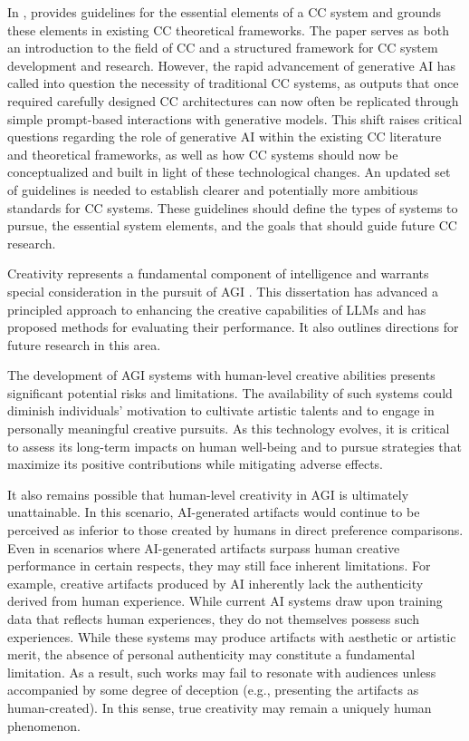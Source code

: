 \documentclass[phd,electronic,oneside,twosidetoc,letterpaper,chaptercenter,parttop,lof]{byumsphd}
\begin{document}
In \cite{ventura2017howto}, \citeauthor{ventura2017howto} provides guidelines for the essential elements of a CC system and grounds these elements in existing CC theoretical frameworks. 
The paper serves as both an introduction to the field of CC and a structured framework for CC system development and research. 
However, the rapid advancement of generative AI has called into question the necessity of traditional CC systems, as outputs that once required carefully designed CC architectures can now often be replicated through simple prompt-based interactions with generative models. 
This shift raises critical questions regarding the role of generative AI within the existing CC literature and theoretical frameworks, as well as how CC systems should now be conceptualized and built in light of these technological changes. 
An updated set of guidelines is needed to establish clearer and potentially more ambitious standards for CC systems. 
These guidelines should define the types of systems to pursue, the essential system elements, and the goals that should guide future CC research.

Creativity represents a fundamental component of intelligence and warrants special consideration in the pursuit of AGI \cite{Morris2023PositionLO}. 
This dissertation has advanced a principled approach to enhancing the creative capabilities of LLMs and has proposed methods for evaluating their performance. 
It also outlines directions for future research in this area.

The development of AGI systems with human-level creative abilities presents significant potential risks and limitations. 
The availability of such systems could diminish individuals' motivation to cultivate artistic talents and to engage in personally meaningful creative pursuits. 
As this technology evolves, it is critical to assess its long-term impacts on human well-being and to pursue strategies that maximize its positive contributions while mitigating adverse effects.

It also remains possible that human-level creativity in AGI is ultimately unattainable. 
In this scenario, AI-generated artifacts would continue to be perceived as inferior to those created by humans in direct preference comparisons. 
Even in scenarios where AI-generated artifacts surpass human creative performance in certain respects, they may still face inherent limitations.
For example, creative artifacts produced by AI inherently lack the authenticity derived from human experience. 
While current AI systems draw upon training data that reflects human experiences, they do not themselves possess such experiences. 
While these systems may produce artifacts with aesthetic or artistic merit, the absence of personal authenticity may constitute a fundamental limitation. 
As a result, such works may fail to resonate with audiences unless accompanied by some degree of deception (e.g., presenting the artifacts as human-created). 
In this sense, true creativity may remain a uniquely human phenomenon.
\end{document}
